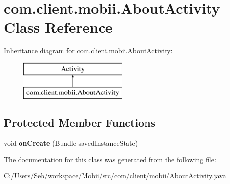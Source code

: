 \hypertarget{classcom_1_1client_1_1mobii_1_1_about_activity}{\section{com.\-client.\-mobii.\-About\-Activity Class Reference}
\label{classcom_1_1client_1_1mobii_1_1_about_activity}
}
Inheritance diagram for com.\-client.\-mobii.\-About\-Activity\-:\begin{figure}[H]
\begin{center}
\leavevmode
\includegraphics[height=2.000000cm]{classcom_1_1client_1_1mobii_1_1_about_activity}
\end{center}
\end{figure}
\subsection*{Protected Member Functions}
\begin{DoxyCompactItemize}
\item 
\hypertarget{classcom_1_1client_1_1mobii_1_1_about_activity_aab16a4a2934facfc1b678314b409dc1f}{void {\bfseries on\-Create} (Bundle saved\-Instance\-State)}\label{classcom_1_1client_1_1mobii_1_1_about_activity_aab16a4a2934facfc1b678314b409dc1f}

\end{DoxyCompactItemize}


The documentation for this class was generated from the following file\-:\begin{DoxyCompactItemize}
\item 
C\-:/\-Users/\-Seb/workspace/\-Mobii/src/com/client/mobii/\hyperlink{_about_activity_8java}{About\-Activity.\-java}\end{DoxyCompactItemize}
